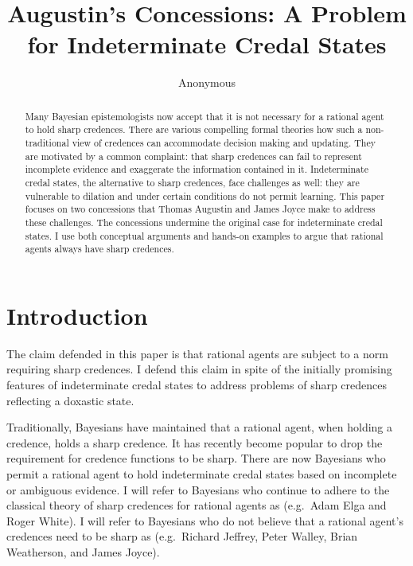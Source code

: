 \documentclass[11pt]{article}
\begin{document}
\setpagewiselinenumbers
\modulolinenumbers[5]
\linenumbers

\title{Augustin's Concessions: A Problem for Indeterminate Credal States}
\author{Anonymous}
\date{}
\maketitle

\begin{abstract} 
  {\noindent}Many Bayesian epistemologists now accept that it is not
  necessary for a rational agent to hold sharp credences. There are
  various compelling formal theories how such a non-traditional view
  of credences can accommodate decision making and updating. They are
  motivated by a common complaint: that sharp credences can fail to
  represent incomplete evidence and exaggerate the information
  contained in it. Indeterminate credal states, the alternative to
  sharp credences, face challenges as well: they are vulnerable to
  dilation and under certain conditions do not permit learning. This
  paper focuses on two concessions that Thomas Augustin and James
  Joyce make to address these challenges. The concessions undermine
  the original case for indeterminate credal states. I use both
  conceptual arguments and hands-on examples to argue that rational
  agents always have sharp credences.
\end{abstract}

\section{Introduction}
\label{Introduction}

The claim defended in this paper is that rational agents are subject
to a norm requiring sharp credences. I defend this claim in spite of
the initially promising features of indeterminate credal states to
address problems of sharp credences reflecting a doxastic state.

Traditionally, Bayesians have maintained that a rational agent, when
holding a credence, holds a sharp credence. It has recently become
popular to drop the requirement for credence functions to be sharp.
There are now Bayesians who permit a rational agent to hold
indeterminate credal states based on incomplete or ambiguous evidence.
I will refer to Bayesians who continue to adhere to the classical
theory of sharp credences for rational agents as 
(e.g.\ Adam Elga and Roger White). I will refer to Bayesians who do
not believe that a rational agent's credences need to be sharp as
 (e.g.\ Richard Jeffrey, Peter Walley, Brian
Weatherson, and James Joyce).
\end{document}
